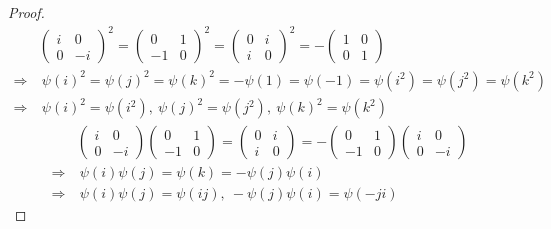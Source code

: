\documentclass[12pt, a4paper, oneside]{ctexart}
\begin{document}
\begin{proof}
    \begin{equation*}
        \begin{aligned}
            &\begin{pmatrix}
                i&0\\0&-i
            \end{pmatrix}
            ^2=\begin{pmatrix}
                0&1\\-1&0
            \end{pmatrix}
            ^2=\begin{pmatrix}
                0&i\\i&0
            \end{pmatrix}
            ^2=-\begin{pmatrix}
                1&0\\0&1
            \end{pmatrix}\\
            \Rightarrow&\ \psi(i)^2=\psi(j)^2=\psi(k)^2=-\psi(1)=\psi(-1)=\psi(i^2)=\psi(j^2)=\psi(k^2)\\
            \Rightarrow&\ \psi(i)^2=\psi(i^2),\ \psi(j)^2=\psi(j^2),\ \psi(k)^2=\psi(k^2)
        \end{aligned}
    \end{equation*}
    \begin{equation*}
        \begin{aligned}
            &\begin{pmatrix}
                i&0\\0&-i
            \end{pmatrix}\begin{pmatrix}
                0&1\\-1&0
            \end{pmatrix}
            =\begin{pmatrix}
                0&i\\i&0
            \end{pmatrix}=-\begin{pmatrix}
                0&1\\-1&0
            \end{pmatrix}
            \begin{pmatrix}
                i&0\\0&-i
            \end{pmatrix}\\
            \Rightarrow&\ \psi(i)\psi(j)=\psi(k)=-\psi(j)\psi(i)\\
            \Rightarrow&\ \psi(i)\psi(j)=\psi(ij),\ -\psi(j)\psi(i)=\psi(-ji)

\end{aligned}
\end{equation*}
\end{proof}
\end{document}
